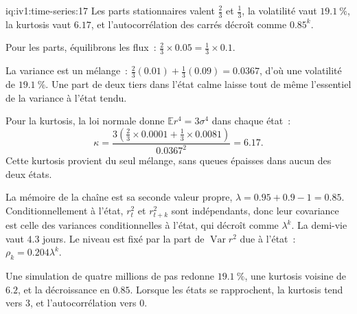 \enlargethispage{-3\baselineskip}%
\begin{solution}{iq:iv1:time-series:17}
Les parts stationnaires valent $\frac23$ et $\frac13$, la volatilité vaut $19.1~\%$, la kurtosis vaut $6.17$, et l'autocorrélation des carrés décroît comme $0.85^k$.

Pour les parts, équilibrons les flux~: $\frac23 \times 0.05 = \frac13 \times 0.1$.

La variance est un mélange~: $\frac23(0.01) + \frac13(0.09) = 0.0367$, d'où une volatilité de $19.1~\%$. Une part de deux tiers dans l'état calme laisse tout de même l'essentiel de la variance à l'état tendu.

Pour la kurtosis, la loi normale donne $\mathbb{E}r^4 = 3\sigma^4$ dans chaque état~:
\[
\kappa = \frac{3(\frac23 \times 0.0001 + \frac13 \times 0.0081)}{0.0367^2} = 6.17.
\]
Cette kurtosis provient du seul mélange, sans queues épaisses dans aucun des deux états.

La mémoire de la chaîne est sa seconde valeur propre, $\lambda = 0.95 + 0.9 - 1 = 0.85$. Conditionnellement à l'état, $r_t^2$ et $r_{t + k}^2$ sont indépendants, donc leur covariance est celle des variances conditionnelles à l'état, qui décroît comme $\lambda^k$. La demi-vie vaut $4.3$ jours. Le niveau est fixé par la part de $\operatorname{Var}r^2$ due à l'état~: $\rho_k = 0.204\lambda^k$.

Une simulation de quatre millions de pas redonne $19.1~\%$, une kurtosis voisine de $6.2$, et la décroissance en $0.85$. Lorsque les états se rapprochent, la kurtosis tend vers 3, et l'autocorrélation vers 0.



\end{solution}

